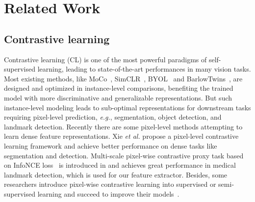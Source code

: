 \documentclass[10pt,twocolumn,letterpaper]{article}
\begin{document}
\section{Related Work}
\subsection{Contrastive learning}
Contrastive learning (CL) is one of the most powerful paradigms of self-supervised learning, leading to state-of-the-art performances in many vision tasks. Most existing methods, like MoCo~\cite{chen2020improved, he2020momentum}, SimCLR~\cite{DBLP:conf/icml/ChenK0H20, chen2020big}, BYOL~\cite{DBLP:conf/nips/GrillSATRBDPGAP20} and BarlowTwins~\cite{DBLP:conf/icml/ZbontarJMLD21}, are designed and optimized in instance-level comparisons, benefiting the trained model with more discriminative and generalizable representations. But such instance-level modeling leads to sub-optimal representations for downstream tasks requiring pixel-level prediction, {\it e.g.}, segmentation, object detection, and landmark detection. Recently there are some pixel-level methods attempting to learn dense feature representations. Xie {\it et al.} \cite{DBLP:conf/cvpr/XieL00L021} propose a pixel-level contrastive learning framework and achieve better performance on dense tasks like segmentation and detection. Multi-scale pixel-wise contrastive proxy task based on InfoNCE loss~\cite{DBLP:journals/jmlr/GutmannH10, oord2018representation} is introduced in \cite{yao2021one} and achieves great performance in medical landmark detection, which is used for our feature extractor. Besides, some researchers introduce pixel-wise contrastive learning into supervised or semi-supervised learning and succeed to improve their models~\cite{DBLP:conf/iclr/LiuZJD22,DBLP:conf/iccv/ZhongYWY0W21,DBLP:conf/ijcai/WangLL0K22}.
\end{document}
